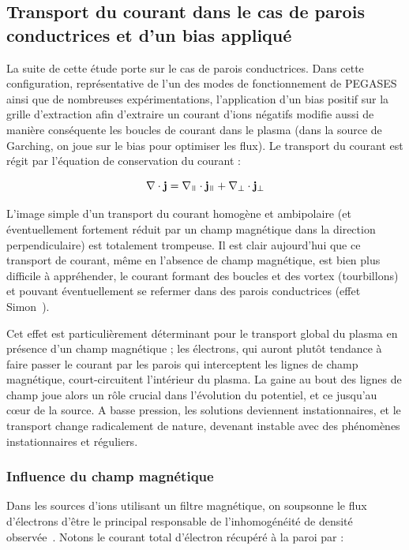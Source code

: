\begin{refsection}
\subsection{Transport du courant dans le cas de parois conductrices et d'un bias
appliqué}

La suite de cette étude porte sur le cas de parois
conductrices. Dans cette configuration, représentative de
l'un des modes de fonctionnement de PEGASES ainsi que de nombreuses
expérimentations, l'application d'un bias positif sur la grille d'extraction afin d'extraire un
courant d'ions négatifs modifie aussi de manière conséquente les boucles de
courant dans le plasma (dans la source de Garching, on joue sur le bias pour
optimiser les flux). Le transport du courant est régit par l'équation de
conservation du courant :

\begin{equation}
\nabla\cdot\mathbf j=\nabla_\para\cdot \mathbf j_\para +\nabla_\perp\cdot
\mathbf j_\perp
\end{equation}

L'image simple d'un transport du courant homogène et
ambipolaire (et éventuellement fortement réduit par un champ magnétique dans la
direction perpendiculaire) est totalement trompeuse. Il est clair aujourd'hui
que ce transport de courant, même en l'absence de champ magnétique, est bien plus difficile à appréhender, le
courant formant des boucles et des vortex (tourbillons) et pouvant
éventuellement se refermer dans des parois conductrices (effet Simon~\parencite{Simon55}).

Cet effet est particulièrement déterminant pour le transport global du
plasma en présence d'un champ magnétique ; les électrons, qui auront plutôt
tendance à faire passer le courant par les parois qui
interceptent les lignes de champ magnétique, court-circuitent l'intérieur du
plasma. La gaine au bout des lignes de champ joue alors un rôle crucial dans
l'évolution du potentiel, et ce jusqu'au c\oe{}ur de la source. A basse
pression, les solutions deviennent instationnaires, et le transport change
radicalement de nature, devenant instable avec des phénomènes instationnaires
et réguliers.
	
\subsubsection{Influence du champ magnétique}
Dans les sources d'ions utilisant un filtre magnétique, on soupsonne le flux
d'électrons d'être le principal responsable de l'inhomogénéité
de densité observée~\parencite{PIC2D,PIC3D}.
Notons le courant total d'électron récupéré à la paroi par :


\end{refsection}
